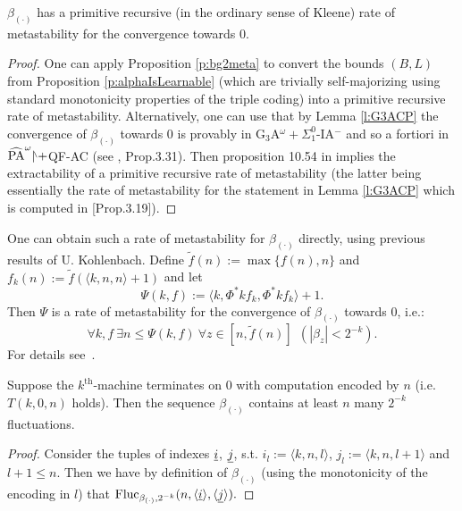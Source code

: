 \begin{cor} \label{metastability-alpha}
$\beta_{(\cdot)}$ has a primitive recursive (in the ordinary sense 
of Kleene) rate of metastability for the convergence towards $0.$
\end{cor}
\begin{proof} One can apply Proposition \ref{p:bg2meta} to convert 
the bounds $(B,L)$ from Proposition \ref{p:alphaIsLearnable} (which are 
trivially self-majorizing using standard monotonicity properties of the 
triple coding) into a primitive 
recursive rate of metastability. Alternatively, one can use that by 
Lemma \ref{l:G3ACP} the convergence of $\beta_{(\cdot)}$ towards $0$ 
is provably in 
G$_3$A$^{\omega}+\Sigma^0_1$-IA$^-$ and so a fortiori  in 
$\widehat{\rm PA}^{\omega}\res+$QF-AC (see \cite{Kohlenbach08}, Prop.3.31).
Then proposition 10.54 in \cite{Kohlenbach08} implies the extractability 
of a primitive recursive rate of metastability (the latter being essentially 
the rate of metastability for the statement in Lemma \ref{l:G3ACP} 
which is computed in \cite{Kohlenbach08}[Prop.3.19]).
\end{proof} 

\begin{rmk}\label{r:metaB}
One can obtain such a rate of metastability for $\beta_{(\cdot)}$ directly, using previous results
of U. Kohlenbach. 
Define $\tilde f(n):=\max\{f(n),n\}$ and $f_k(n):=\tilde f(\langle k,n,n\rangle+1)$ and let
\[
\Psi(k,f):=\langle k,\Phi^*kf_k,\Phi^*kf_k\rangle + 1.
\]
Then $\Psi$ is a rate of metastability for the convergence of 
$\beta_{(\cdot)}$ towards $0$, i.e.:
\[
\forall k,f\ \exists n\leq \Psi(k,f)\ \forall z\in[n,\tilde f(n)]\ \ 
(|\beta_z|< 2^{-k}).
\]
For details see~\cite{KS13}.
\end{rmk}

\begin{lemma}\label{l:2n}
Suppose the $k^\text{th}$-machine terminates on $0$ with computation encoded by $n$ (i.e. $T(k,0,n)$ holds). Then the sequence $\beta_{(\cdot)}$ contains at 
least $n$ many $2^{-k}$\nbd fluctuations.
\end{lemma}
\begin{proof}
Consider the tuples of indexes $\underline i$, $\underline j$, 
s.t. $i_l:=\langle k,n,l\rangle$, $j_l:=\langle k,n,l+1\rangle$ and $l+1\leq n$. Then we have by definition of $\beta_{(\cdot)}$ (using the monotonicity of the encoding in $l$) that
$
\operatorname{Fluc}_{\beta_{(\cdot)},2^{-k}}(n,\langle \underline i \rangle, \langle \underline j\rangle).
$
\end{proof}

